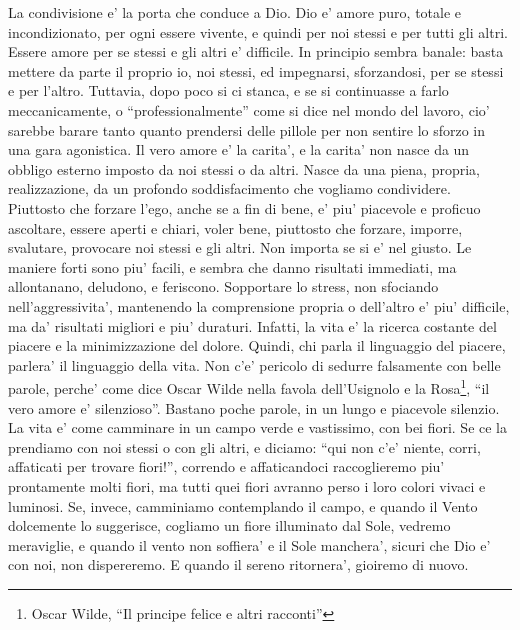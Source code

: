 La condivisione e' la porta che conduce a Dio. Dio e' amore puro, totale e incondizionato, per ogni essere vivente, e quindi per noi stessi e per tutti gli altri.
Essere amore per se stessi e gli altri e' difficile. In principio sembra banale: basta mettere da parte il proprio io, noi stessi, ed impegnarsi, sforzandosi, per se stessi e per l'altro. Tuttavia, dopo poco si ci stanca, e se si continuasse a farlo meccanicamente, o ``professionalmente'' come si dice nel mondo del lavoro, cio' sarebbe barare tanto quanto prendersi delle pillole per non sentire lo sforzo in una gara agonistica.
Il vero amore e' la carita', e la carita' non nasce da un obbligo esterno imposto da noi stessi o da altri. Nasce da una piena, propria, realizzazione, da un profondo soddisfacimento che vogliamo condividere.
Piuttosto che forzare l'ego, anche se a fin di bene, e' piu' piacevole e proficuo ascoltare, essere aperti e chiari, voler bene, piuttosto che forzare, imporre, svalutare, provocare noi stessi e gli altri. Non importa se si e' nel giusto. Le maniere forti sono piu' facili, e sembra che danno risultati immediati, ma allontanano, deludono, e feriscono. Sopportare lo stress, non sfociando nell'aggressivita', mantenendo la comprensione propria o dell'altro e' piu' difficile, ma da' risultati migliori e piu' duraturi. Infatti, la vita e' la ricerca costante del piacere e la minimizzazione del dolore. Quindi, chi parla il linguaggio del piacere, parlera' il linguaggio della vita. Non c'e' pericolo di sedurre falsamente con belle parole, perche' come dice Oscar Wilde nella favola dell'Usignolo e la Rosa\footnote{Oscar Wilde, ``Il principe felice e altri racconti''}, ``il vero amore e' silenzioso''. Bastano poche parole, in un lungo e piacevole silenzio.
La vita e' come camminare in un campo verde e vastissimo, con bei fiori. Se ce la prendiamo con noi stessi o con gli altri, e diciamo: ``qui non c'e' niente, corri, affaticati per trovare fiori!'', correndo e affaticandoci raccoglieremo piu' prontamente molti fiori, ma tutti quei fiori avranno perso i loro colori vivaci e luminosi. Se, invece, camminiamo contemplando il campo, e quando il Vento dolcemente lo suggerisce, cogliamo un fiore illuminato dal Sole, vedremo meraviglie, e quando il vento non soffiera' e il Sole manchera', sicuri che Dio e' con noi, non dispereremo. E quando il sereno ritornera', gioiremo di nuovo.

